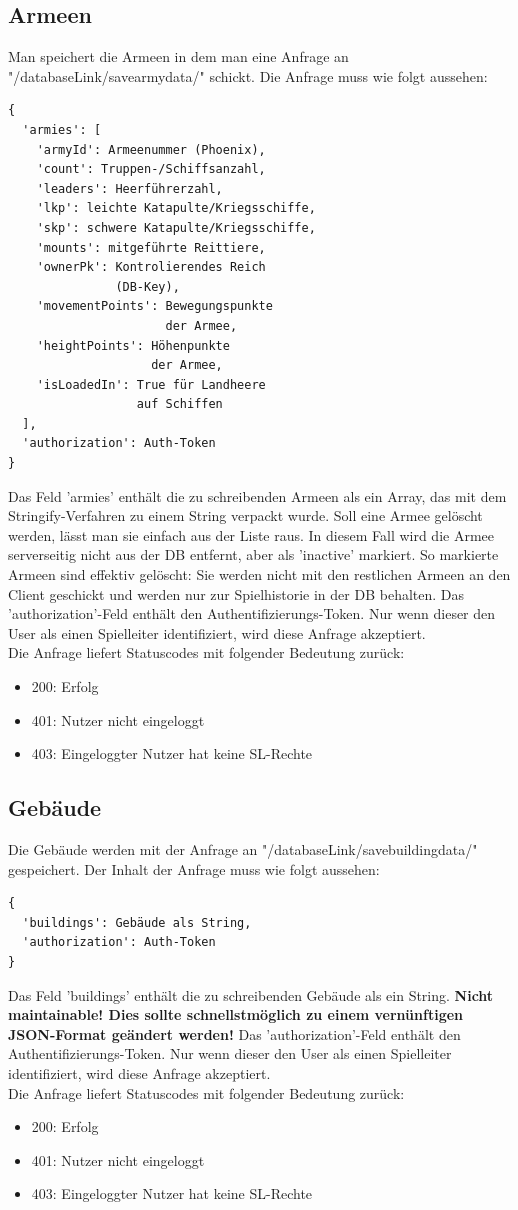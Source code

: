 \documentclass[11pt,a4paper,twocolumn]{article}
\begin{document}
\subsection{Armeen}\label{ss:write_armies}
Man speichert die Armeen in dem man eine Anfrage an "/databaseLink/savearmydata/" schickt. Die Anfrage muss wie folgt aussehen:
\begin{lstlisting}
{
  'armies': [
    'armyId': Armeenummer (Phoenix),
	'count': Truppen-/Schiffsanzahl,
    'leaders': Heerführerzahl,
    'lkp': leichte Katapulte/Kriegsschiffe,
    'skp': schwere Katapulte/Kriegsschiffe,
    'mounts': mitgeführte Reittiere,
    'ownerPk': Kontrolierendes Reich 
               (DB-Key),
    'movementPoints': Bewegungspunkte 
                      der Armee,
    'heightPoints': Höhenpunkte 
                    der Armee,
    'isLoadedIn': True für Landheere 
                  auf Schiffen
  ],
  'authorization': Auth-Token
}
\end{lstlisting}
Das Feld 'armies' enthält die zu schreibenden Armeen als ein Array, das mit dem Stringify-Verfahren zu einem String verpackt wurde. Soll eine Armee gelöscht werden, lässt man sie einfach aus der Liste raus. In diesem Fall wird die Armee serverseitig nicht aus der DB entfernt, aber als 'inactive' markiert. So markierte Armeen sind effektiv gelöscht: Sie werden nicht mit den restlichen Armeen an den Client geschickt und werden nur zur Spielhistorie in der DB behalten. Das 'authorization'-Feld enthält den Authentifizierungs-Token. Nur wenn dieser den User als einen Spielleiter identifiziert, wird diese Anfrage akzeptiert.\\
Die Anfrage liefert Statuscodes mit folgender Bedeutung zurück:
\begin{itemize}
\item 200: Erfolg
\item 401: Nutzer nicht eingeloggt
\item 403: Eingeloggter Nutzer hat keine SL-Rechte
\end{itemize}
\subsection{Gebäude}\label{ss:write_buildings}
Die Gebäude werden mit der Anfrage an "/databaseLink/savebuildingdata/" gespeichert. Der Inhalt der Anfrage muss wie folgt aussehen:
\begin{lstlisting}
{
  'buildings': Gebäude als String,
  'authorization': Auth-Token
}
\end{lstlisting}
Das Feld 'buildings' enthält die zu schreibenden Gebäude als ein String. \textbf{ Nicht maintainable! Dies sollte schnellstmöglich zu einem vernünftigen JSON-Format geändert werden!} Das 'authorization'-Feld enthält den Authentifizierungs-Token. Nur wenn dieser den User als einen Spielleiter identifiziert, wird diese Anfrage akzeptiert.\\
Die Anfrage liefert Statuscodes mit folgender Bedeutung zurück:
\begin{itemize}
\item 200: Erfolg
\item 401: Nutzer nicht eingeloggt
\item 403: Eingeloggter Nutzer hat keine SL-Rechte
\end{itemize}
\end{document}
